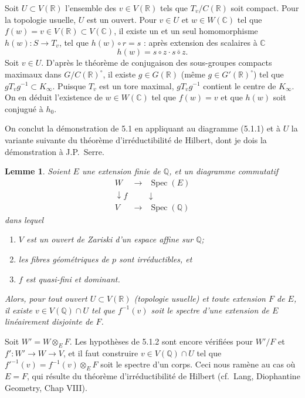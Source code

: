\documentclass[11pt]{amsart}
\theoremstyle{plain}
\newtheorem{lemma}[theorem]{Lemme}
\theoremstyle{definition}
\DeclareMathOperator{\Spec}{Spec}
\newcommand{\QQ}{\mathbb{Q}}
\newcommand{\RR}{\mathbb{R}}
\newcommand{\CC}{\mathbb{C}}
\begin{document}
Soit $U \subset V(\RR)$ l'ensemble des $v \in V(\RR)$ tels que $T_v/C(\RR)$ soit compact. Pour la topologie usuelle, $U$ est un ouvert. Pour $v \in U$ et $w \in W(\CC)$ tel que $f(w) = v \in V(\RR) \subset V(\CC)$, il existe un et un seul homomorphisme $h(w) : S \to T_v$, tel que $h(w) \circ r = s$ : apr\`es extension des scalaires \`a $\CC$
\[
h(w) = s \circ z \cdot \overline{s \circ z}.
\]
Soit $v \in U$. D'apr\`es le th\'eor\`eme de conjugaison des sous-groupes compacts maximaux dans $G/C(\RR)^\circ$, il existe $g \in G(\RR)$ (m\^eme $g \in G'(\RR)^\circ$) tel que $g T_v g^{-1} \subset K_\infty$. Puisque $T_v$ est un tore maximal, $g T_v g^{-1}$ contient le centre de $K_\infty$. On en d\'eduit l'existence de $w \in W(\CC)$ tel que $f(w) = v$ et que $h(w)$ soit conjugu\'e \`a $h_0$.

On conclut la d\'emonstration de 5.1 en appliquant au diagramme (5.1.1) et \`a $U$ la variante suivante du th\'eor\`eme d'irr\'eductibilit\'e de Hilbert, dont je dois la d\'emonstration \`a J.P.\ Serre.

\begin{lemma}
Soient $E$ une extension finie de $\QQ$, et un diagramme commutatif
\[
\begin{array}{ccc}
W & \longrightarrow & \Spec(E) \\
\downarrow f & & \downarrow \\
V & \longrightarrow & \Spec(\QQ)
\end{array}
\]
dans lequel
\begin{enumerate}
\item[(i)] $V$ est un ouvert de Zariski d'un espace affine sur $\QQ$;
\item[(ii)] les fibres g\'eom\'etriques de $p$ sont irr\'eductibles, et
\item[(iii)] $f$ est quasi-fini et dominant.
\end{enumerate}
Alors, pour tout ouvert $U \subset V(\RR)$ (topologie usuelle) et toute extension $F$ de $E$, il existe $v \in V(\QQ) \cap U$ tel que $f^{-1}(v)$ soit le spectre d'une extension de $E$ lin\'eairement disjointe de $F$.
\end{lemma}

Soit $W' = W \otimes_E F$. Les hypoth\`eses de 5.1.2 sont encore v\'erifi\'ees pour $W'/F$ et $f' : W' \to W \to V$, et il faut construire $v \in V(\QQ) \cap U$ tel que $f'^{-1}(v) = f^{-1}(v) \otimes_E F$ soit le spectre d'un corps. Ceci nous ram\`ene au cas o\`u $E = F$, qui r\'esulte du th\'eor\`eme d'irr\'eductibilit\'e de Hilbert (cf.\ Lang, Diophantine Geometry, Chap VIII).
\end{document}
